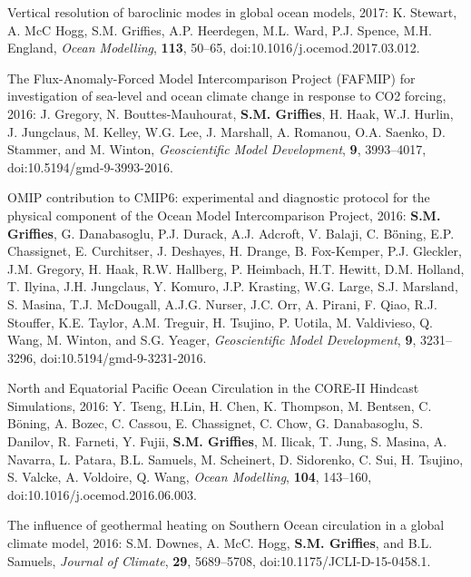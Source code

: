 \begin{etaremune}
\item Vertical resolution of baroclinic modes in global ocean models,
  2017: K. Stewart, A. McC Hogg, S.M. Grif\/f\/ies, A.P. Heerdegen,
  M.L. Ward, P.J. Spence, M.H. England,  {\it Ocean Modelling},
  {\bf 113}, 50--65, doi:10.1016/j.ocemod.2017.03.012.

\item The Flux-Anomaly-Forced Model Intercomparison Project (FAFMIP)
  for investigation of sea-level and ocean climate change in response
  to CO2 forcing, 2016: J. Gregory, N. Bouttes-Mauhourat, {\bf
    S.M. Grif\/f\/ies}, H. Haak, W.J. Hurlin, J.  Jungclaus,
  M. Kelley, W.G. Lee, J. Marshall, A. Romanou, O.A. Saenko,
  D. Stammer, and M.  Winton, {\it Geoscientific Model Development},
  {\bf 9}, 3993--4017, doi:10.5194/gmd-9-3993-2016.






\item OMIP contribution to CMIP6: experimental and diagnostic protocol for the physical component of the Ocean Model Intercomparison  Project, 2016: {\bf S.M. Grif\/f\/ies}, G. Danabasoglu, P.J. Durack,
  A.J. Adcroft, V. Balaji, C. B\"{o}̈ning, E.P. Chassignet,
  E. Curchitser, J. Deshayes, H. Drange, B. Fox-Kemper, P.J. Gleckler,
  J.M. Gregory, H. Haak, R.W. Hallberg, P. Heimbach, H.T. Hewitt,
  D.M. Holland, T. Ilyina, J.H. Jungclaus, Y. Komuro, J.P. Krasting,
  W.G. Large, S.J. Marsland, S. Masina, T.J. McDougall, A.J.G. Nurser,
  J.C. Orr, A. Pirani, F. Qiao, R.J. Stouffer, K.E. Taylor,
  A.M. Treguir, H. Tsujino, P. Uotila, M. Valdivieso, Q. Wang,
  M. Winton, and S.G. Yeager, {\it Geoscientific Model Development},
  {\bf 9}, 3231--3296, doi:10.5194/gmd-9-3231-2016.

\item North and Equatorial Pacific Ocean Circulation in the CORE-II
  Hindcast Simulations, 2016: Y. Tseng, H.Lin, H. Chen, K.  Thompson,
  M. Bentsen, C. B\"{o}ning, A. Bozec, C. Cassou, E.  Chassignet,
  C. Chow, G. Danabasoglu, S. Danilov, R. Farneti, Y. Fujii, {\bf
    S.M. Grif\/f\/ies}, M. Ilicak, T. Jung, S. Masina, A. Navarra,
  L. Patara, B.L.  Samuels, M. Scheinert, D. Sidorenko, C. Sui,
  H. Tsujino, S. Valcke, A. Voldoire, Q. Wang, {\it Ocean Modelling},
  {\bf 104}, 143--160, doi:10.1016/j.ocemod.2016.06.003.

\item The influence of geothermal heating on Southern Ocean
  circulation in a global climate model, 2016: S.M. Downes,
  A. McC. Hogg, {\bf S.M. Grif\/f\/ies}, and B.L. Samuels, {\it
    Journal of Climate}, {\bf 29}, 5689--5708,
  doi:10.1175/JCLI-D-15-0458.1.


\end{etaremune}
